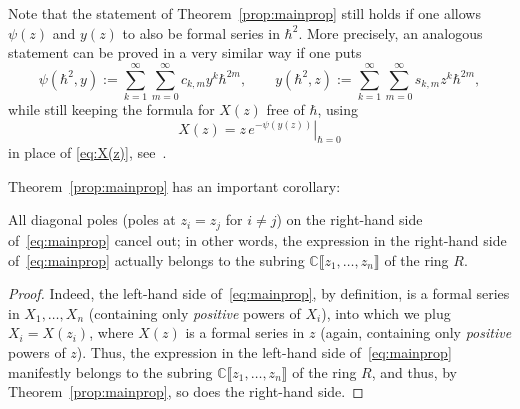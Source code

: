 \begin{remark} \label{rem:DHdeformed}
Note that the statement of Theorem~\ref{prop:mainprop} still holds if one allows $\psi(z)$ and $y(z)$ to also be formal series in $\hbar^2$. More precisely, an analogous statement can be proved in a very similar way if one puts
\[
\psi(\hbar^2,y):=\sum_{k=1}^\infty\sum_{m=0}^\infty c_{k,m} y^k\hbar^{2m},\qquad
y(\hbar^2,z):=\sum_{k=1}^\infty\sum_{m=0}^\infty s_{k,m} z^k\hbar^{2m},
\]
while still keeping the formula for $X(z)$ free of $\hbar$, \ie using
\begin{equation*}
X(z)=\left.z\,e^{-\psi(y(z))}\right|_{\hbar=0}
\end{equation*}
in place of \eqref{eq:X(z)}, see~\cite[\S 2]{BDKS21toprec}.
\end{remark}

Theorem~\ref{prop:mainprop} has an important corollary:

\begin{corollary}\label{cor:diagonal}
All diagonal poles (\ie poles at $z_i=z_j$ for $i\neq j$) on the right-hand side of~\eqref{eq:mainprop} cancel out; in other words, the expression in the right-hand side of~\eqref{eq:mainprop} actually belongs to the subring $\mathbb{C}\llbracket z_1,\dots,z_n\rrbracket $ of the ring $R$.
\end{corollary}
\begin{proof}
Indeed, the left-hand side of~\eqref{eq:mainprop}, by definition, is a formal series in $X_1,\dots,X_n$ (containing only \emph{positive} powers of $X_i$), into which we plug $X_i=X(z_i)$, where $X(z)$ is a formal series in $z$ (again, containing only \emph{positive} powers of $z$). Thus, the expression in the left-hand side of~\eqref{eq:mainprop} manifestly belongs to the subring $\mathbb{C}\llbracket z_1,\dots,z_n\rrbracket $ of the ring $R$, and thus, by Theorem~\ref{prop:mainprop}, so does the right-hand side.
\end{proof}

